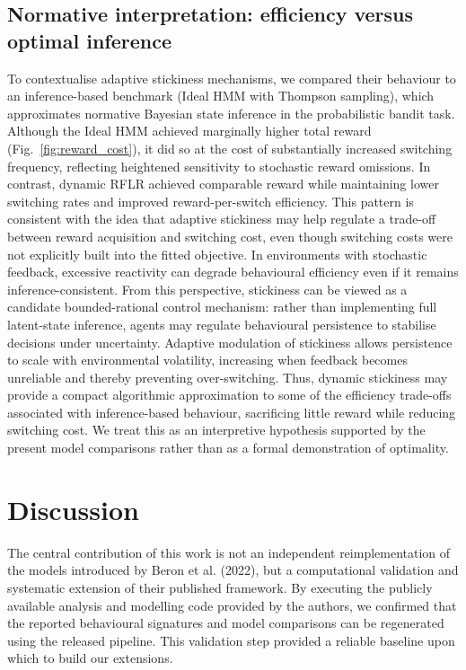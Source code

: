 \documentclass[11pt, reprint, aps, prl]{revtex4-2}
\begin{document}
\subsection{Normative interpretation: efficiency versus optimal inference}
To contextualise adaptive stickiness mechanisms, we compared their behaviour to an inference-based benchmark (Ideal HMM with Thompson sampling), which approximates normative Bayesian state inference in the probabilistic bandit task. Although the Ideal HMM achieved marginally higher total reward (Fig.~\ref{fig:reward_cost}), it did so at the cost of substantially increased switching frequency, reflecting heightened sensitivity to stochastic reward omissions. 
In contrast, dynamic RFLR achieved comparable reward while maintaining lower switching rates and improved reward-per-switch efficiency. This pattern is consistent with the idea that adaptive stickiness may help regulate a trade-off between reward acquisition and switching cost, even though switching costs were not explicitly built into the fitted objective. In environments with stochastic feedback, excessive reactivity can degrade behavioural efficiency even if it remains inference-consistent.
From this perspective, stickiness can be viewed as a candidate bounded-rational control mechanism: rather than implementing full latent-state inference, agents may regulate behavioural persistence to stabilise decisions under uncertainty. Adaptive modulation of stickiness allows persistence to scale with environmental volatility, increasing when feedback becomes unreliable and thereby preventing over-switching. 
Thus, dynamic stickiness may provide a compact algorithmic approximation to some of the efficiency trade-offs associated with inference-based behaviour, sacrificing little reward while reducing switching cost. We treat this as an interpretive hypothesis supported by the present model comparisons rather than as a formal demonstration of optimality.





\section{Discussion}
The central contribution of this work is not an independent reimplementation of the models introduced by Beron et al. (2022), but a computational validation and systematic extension of their published framework. By executing the publicly available analysis and modelling code provided by the authors, we confirmed that the reported behavioural signatures and model comparisons can be regenerated using the released pipeline. This validation step provided a reliable baseline upon which to build our extensions.
\end{document}
